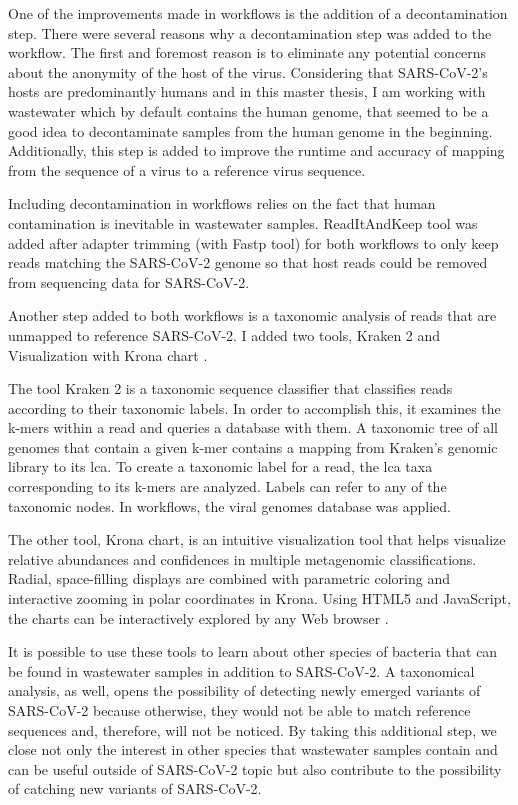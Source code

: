            One of the improvements made in workflows is the addition of a decontamination step. There were several reasons why a decontamination step was added to the workflow. The first and foremost reason is to eliminate any potential concerns about the anonymity of the host of the virus. Considering that SARS-CoV-2's hosts are predominantly humans and in this master thesis, I am working with wastewater which by default contains the human genome, that seemed to be a good idea to decontaminate samples from the human genome in the beginning. Additionally, this step is added to improve the runtime and accuracy of mapping from the sequence of a virus to a reference virus sequence. 
            
            Including decontamination in workflows relies on the fact that human contamination is inevitable in wastewater samples. ReadItAndKeep tool \cite{hunt2022} was added after adapter trimming (with Fastp tool) for both workflows to only keep reads matching the SARS-CoV-2 genome so that host reads could be removed from sequencing data for SARS-CoV-2. 
            
            Another step added to both workflows is a taxonomic analysis of reads that are unmapped to reference SARS-CoV-2.  I added two tools, Kraken 2 \cite{wood2014,wood2019,lu2020} and Visualization with Krona chart \cite{ondov2011,cuccuru2014}. 
            
            The tool Kraken 2 is a taxonomic sequence classifier that classifies reads according to their taxonomic labels. In order to accomplish this, it examines the k-mers within a read and queries a database with them. A taxonomic tree of all genomes that contain a given k-mer contains a mapping from Kraken's genomic library to its \acrfull{lca}. To create a taxonomic label for a read, the \acrshort{lca} taxa corresponding to its k-mers are analyzed. Labels can refer to any of the taxonomic nodes. In workflows, the viral genomes database was applied.
            
            The other tool, Krona chart, is an intuitive visualization tool that helps visualize relative abundances and confidences in multiple metagenomic classifications. Radial, space-filling displays are combined with parametric coloring and interactive zooming in polar coordinates in Krona. Using HTML5 and JavaScript, the charts can be interactively explored by any Web browser \cite{ondov2011}.
            
            It is possible to use these tools to learn about other species of bacteria that can be found in wastewater samples in addition to SARS-CoV-2. A taxonomical analysis, as well, opens the possibility of detecting newly emerged variants of SARS-CoV-2 because otherwise, they would not be able to match reference sequences and, therefore, will not be noticed. By taking this additional step, we close not only the interest in other species that wastewater samples contain and can be useful outside of SARS-CoV-2 topic but also contribute to the possibility of catching new variants of SARS-CoV-2. 
            
